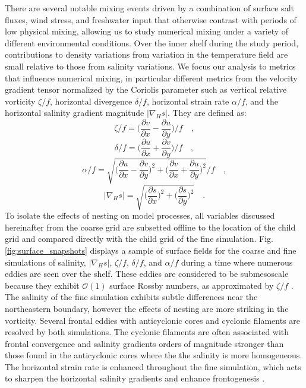 There are several notable mixing events driven by a combination of surface salt fluxes, wind stress, and freshwater input that otherwise contrast with periods of low physical mixing, allowing us to study numerical mixing under a variety of different environmental conditions. Over the inner shelf during the study period, contributions to density variations from variation in the temperature field are small relative to those from salinity variations. We focus our analysis to metrics that influence numerical mixing, in particular different metrics from the velocity gradient tensor normalized by the Coriolis parameter such as vertical relative vorticity $\zeta/f$, horizontal divergence $\delta/f$, horizontal strain rate $\alpha/f$, and the horizontal salinity gradient magnitude $|\nabla_H s|$. They are defined as:
\begin{equation}
    \zeta/f = \bigg(\frac{\partial v}{\partial x} - \frac{\partial u}{\partial y}\bigg)/f \quad ,
\end{equation}
\begin{equation}
    \delta/f = \bigg(\frac{\partial u}{\partial x} + \frac{\partial v}{\partial y}\bigg)/f \quad ,
\end{equation}
\begin{equation}
    \alpha/f = \sqrt{\bigg(\frac{\partial u}{\partial x} - \frac{\partial v}{\partial y}\bigg)^2+\bigg(\frac{\partial v}{\partial x} + \frac{\partial u}{\partial y}\bigg)^2}/f \quad ,
\end{equation}
\begin{equation}
    |\nabla_H s| = \sqrt{\bigg(\frac{\partial s}{\partial x} \bigg) ^2 + \bigg(\frac{\partial s}{\partial y} \bigg)^2} \quad .
\end{equation}
To isolate the effects of nesting on model processes, all variables discussed hereinafter from the coarse grid are subsetted offline to the location of the child grid and compared directly with the child grid of the fine simulation. Fig. \ref{fig:surface_snapshots} displays a sample of surface fields for the coarse and fine simulations of salinity, $|\nabla_H s|$, $\zeta/f$, $\delta/f$, and $\alpha/f$ during a time where numerous eddies are seen over the shelf. These eddies are considered to be submesoscale because they exhibit $\mathcal{O}(1)$ surface Rossby numbers, as approximated by $\zeta/f$ \citet{Barkan_2017, Kobashi_2020, McWilliams_2016}. The salinity of the fine simulation exhibits subtle differences near the northeastern boundary, however the effects of nesting are more striking in the vorticity. Several frontal eddies with anticyclonic cores and cyclonic filaments are resolved by both simulations. The cyclonic filaments are often associated with frontal convergence \citep{Kobashi_2020, qu2022rapid} and salinity gradients orders of magnitude stronger than those found in the anticyclonic cores where the the salinity is more homogeneous. The horizontal strain rate is enhanced throughout the fine simulation, which acts to sharpen the horizontal salinity gradients and enhance frontogenesis \citep{Hoskins_1972}.

